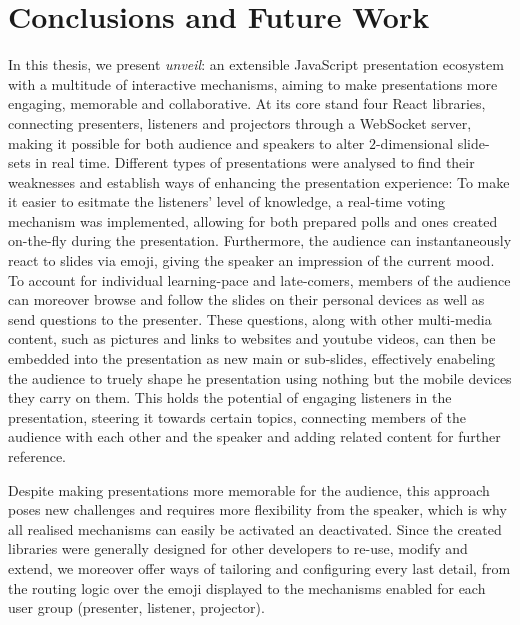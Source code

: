 \chapter{Conclusions and Future Work}
\label{cha:conclusion}

In this thesis, we present \emph{unveil}: an extensible JavaScript presentation eco\-system with a multitude of interactive mechanisms, aiming to make presentations more engaging, memorable and collaborative. At its core stand four React libraries, connecting presenters, listeners and projectors through a WebSocket server, making it possible for both audience and speakers to alter $2$-dimensional slide-sets in real time.
Different types of presentations were analysed to find their weaknesses and establish ways of enhancing the presentation experience: To make it easier to esitmate the listeners' level of knowledge, a real-time voting mechanism was implemented, allowing for both prepared polls and ones created on-the-fly during the presentation. Furthermore, the audience can instantaneously react to slides via emoji, giving the speaker an impression of the current mood. To account for individual learning-pace and late-comers, members of the audience can moreover browse and follow the slides on their personal devices as well as send questions to the presenter.
These questions, along with other multi-media content, such as pictures and links to websites and youtube videos, can then be embedded into the presentation as new main or sub-slides, effectively enabeling the audience to truely shape he presentation using nothing but the mobile devices they carry on them. This holds the potential of engaging listeners in the presentation, steering it towards certain topics, connecting members of the audience with each other and the speaker and adding related content for further reference.

Despite making presentations more memorable for the audience, this approach poses new challenges and requires more flexibility from the speaker, which is why all realised mechanisms can easily be activated an deactivated. Since the created libraries were generally designed for other developers to re-use, modify and extend, we moreover offer ways of tailoring and configuring every last detail, from the routing logic over the emoji displayed to the mechanisms enabled for each user group (presenter, listener, projector).

